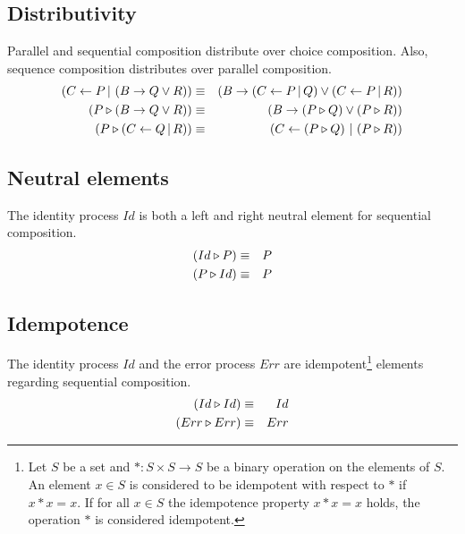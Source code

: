 \subsection{Distributivity}
Parallel and sequential composition distribute over choice composition. Also, sequence composition distributes over parallel composition.
\begin{eqnarray*}
  \left( C \gets P \, | \, \left( B \to Q \vee R \right) \right) & \equiv & \left( B \to \left( C \gets P \, | \, Q \right) \vee \left( C \gets P \, | \, R \right) \right) \\
  \left( P \triangleright \left( B \to Q \vee R \right) \right) & \equiv & \left( B \to \left( P \triangleright Q \right) \vee \left( P \triangleright R \right) \right) \\
  \left( P \triangleright \left( C \gets Q \, | \, R \right) \right) & \equiv & \left( C \gets \left( P \triangleright Q \right) \, | \, \left( P \triangleright R \right) \right)
\end{eqnarray*}

\subsection{Neutral elements}
The identity process $Id$ is both a left and right neutral element for sequential composition.
\begin{eqnarray*}
  \left( Id \triangleright P \right) & \equiv & P \\
  \left( P \triangleright Id \right) & \equiv & P
\end{eqnarray*}

\subsection{Idempotence}
The identity process $Id$ and the error process $Err$ are idempotent\footnote{Let $S$ be a set and $\ast \colon S \times S \to S$ be a binary operation on the elements of $S$. An element $x \in S$ is considered to be idempotent with respect to $\ast$ if $x \ast x = x$. If for all $x \in S$ the idempotence property $x \ast x = x$ holds, the operation $\ast$ is considered idempotent.} elements regarding sequential composition.
\begin{eqnarray*}
  \left( Id \triangleright Id \right) & \equiv & Id \\
  \left( Err \triangleright Err \right) & \equiv & Err \\
\end{eqnarray*}